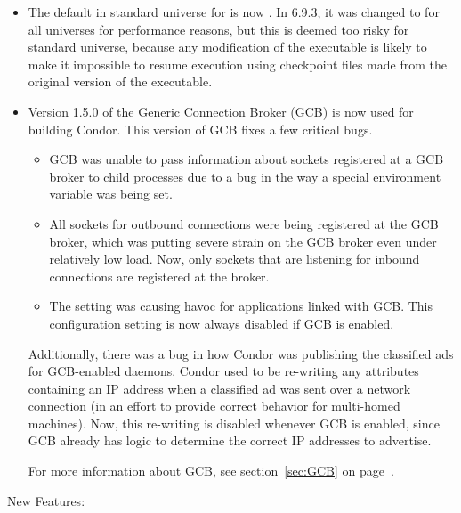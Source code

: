 \begin{itemize}

\item The default in standard universe for 
is now .  In 6.9.3, it was changed to  for all
universes for performance reasons, but this is deemed too risky for
standard universe, because any modification of the executable is
likely to make it impossible to resume execution using checkpoint
files made from the original version of the executable.

\item Version 1.5.0 of the Generic Connection Broker (GCB) is
  now used for building Condor.
  This version of GCB fixes a few critical bugs.
  \begin{itemize}
    \item GCB was unable to pass information about sockets registered
      at a GCB broker to child processes due to a bug in the way a
      special environment variable was being set.
    \item All sockets for outbound connections were being registered
      at the GCB broker, which was putting severe strain on the GCB
      broker even under relatively low load.
      Now, only sockets that are listening for inbound connections are
      registered at the broker.
    \item The  setting was
      causing havoc for applications linked with GCB.
      This configuration setting is now always disabled if GCB is enabled.
  \end{itemize}

  Additionally, there was a bug in how Condor was publishing the
  classified ads for GCB-enabled daemons.
  Condor used to be re-writing any attributes containing an IP address
  when a classified ad was sent over a network connection (in an
  effort to provide correct behavior for multi-homed machines).
  Now, this re-writing is disabled whenever GCB is enabled, since GCB
  already has logic to determine the correct IP addresses to advertise.

  For more information about GCB, see section~\ref{sec:GCB} on
  page~\pageref{sec:GCB}. 

\end{itemize}


\noindent New Features:

